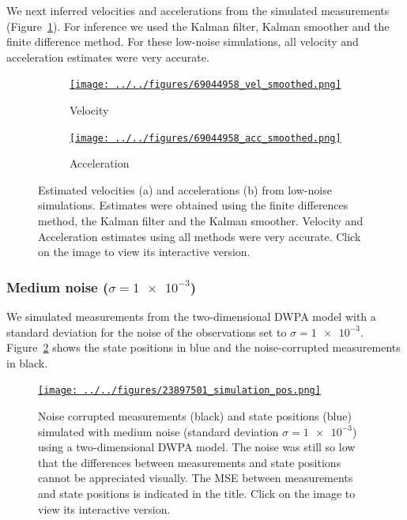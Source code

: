 \documentclass[12pt]{article}
\begin{document}
We next inferred velocities and accelerations from the simulated measurements
(Figure~\ref{fig:vel_acc_low_noise}). For inference we used the Kalman filter,
Kalman smoother and the finite difference method. For these low-noise
simulations, all velocity and acceleration estimates were very accurate.

\begin{figure}

    \begin{subfigure}{\textwidth}
        \centering
        \href{http://www.gatsby.ucl.ac.uk/~rapela/fwg/lds_repo/inference/figures/69044958_vel_smoothed.html}{\texttt{[image: ../../figures/69044958\_vel\_smoothed.png]}}
        \caption{Velocity}
    \end{subfigure}

    \begin{subfigure}{\textwidth}
        \centering
        \href{http://www.gatsby.ucl.ac.uk/~rapela/fwg/lds_repo/inference/figures/69044958_acc_smoothed.html}{\texttt{[image: ../../figures/69044958\_acc\_smoothed.png]}}
        \caption{Acceleration}
    \end{subfigure}

    \caption{Estimated velocities (a) and accelerations (b) from low-noise
    simulations.  Estimates were obtained using the finite differences method,
    the Kalman filter and the Kalman smoother. Velocity and Acceleration
    estimates using all methods were very accurate.
    Click on the image to view its interactive version.}

    \label{fig:vel_acc_low_noise}

\end{figure}

\subsubsection{Medium noise ($\sigma=\num{1e-3}$)}

We simulated measurements from the two-dimensional DWPA model with a standard
deviation for the noise of the observations set to $\sigma=\num{1e-3}$.
Figure~\ref{fig:simulations_medium_noise} shows the state positions in blue and
the noise-corrupted measurements in black.

\begin{figure}

    \centering
    \href{http://www.gatsby.ucl.ac.uk/~rapela/fwg/lds_repo/inference/figures/23897501_simulation_pos.html}{\texttt{[image: ../../figures/23897501\_simulation\_pos.png]}}

    \caption{Noise corrupted measurements (black) and state positions (blue)
    simulated with medium noise (standard deviation $\sigma=\num{1e-3}$) using
    a two-dimensional DWPA model.  The noise was still so low that the
    differences between measurements and state positions cannot be appreciated
    visually.  The MSE between measurements and state positions is indicated in
    the title. Click on the image to view its interactive version.}

    \label{fig:simulations_medium_noise}

\end{figure}
\end{document}
